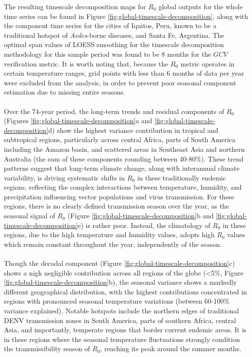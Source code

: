 \documentclass[10pt,twocolumn]{wlscirep}
\begin{document}
The resulting timescale decomposition maps for $R_0$ global outputs for the whole time series can be found in Figure \ref{fig:global-timescale-decomposition}, along with the component time series for the cities of Iquitos, Peru, known to be a traditional hotspot of \textit{Aedes}-borne diseases, and Santa Fe, Argentina. The optimal span values of LOESS smoothing for the timescale decomposition methodology for this sample period was found to be 8 months for the $GCV$ verification metric. It is worth noting that, because the $R_0$ metric operates in certain temperature ranges, grid points with less than 6 months of data per year were excluded from the analysis, in order to prevent poor seasonal component estimation due to missing entire seasons.
\\
\\
Over the 74-year period, the long-term trends and residual components of $R_0$ (Figures \ref{fig:global-timescale-decomposition}a and \ref{fig:global-timescale-decomposition}d) show the highest variance contribution in tropical and subtropical regions, particularly across central Africa, parts of South America including the Amazon basin, and scattered areas in Southeast Asia and northern Australia (the sum of these components rounding between 40-80\%). These trend patterns suggest that long-term climate change, along with interannual climate variability, is driving systematic shifts in $R_0$ in these traditionally endemic regions, reflecting the complex interactions between temperature, humidity, and precipitation influencing vector populations and virus transmission. For these regions, there is no clearly defined transmission season over the year, as the seasonal signal of $R_0$ (Figure \ref{fig:global-timescale-decomposition}b and \ref{fig:global-timescale-decomposition}e) is rather poor. Instead, the climatology of $R_0$ in these regions, due to the high temperature and humidity values, adopts high $R_0$ values which remain constant throughout the year, independently of the season.
\\
\\
Though the decadal component (Figure \ref{fig:global-timescale-decomposition}c) shows a nigh negligible contribution across all regions of the globe (<5\%, Figure \ref{fig:global-timescale-decomposition}b), the seasonal variance shows a markedly different geographical distribution, with the highest contributions concentrated in regions with pronounced seasonal temperature variations (between 60-100\% variance explained). Notable hotspots include the northern edges of traditional DENV transmission zones in South America, parts of southern Africa, central Asia, and importantly, temperate regions that border current endemic areas. It is in these regions where the seasonal temperature fluctuations strongly condition the transmissibility season of $R_0$, reaching its peak around the summer months.
\end{document}
